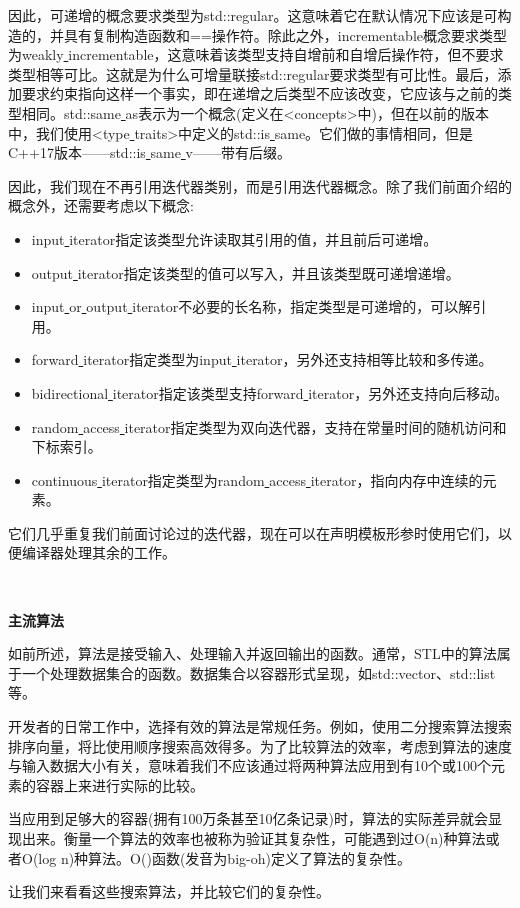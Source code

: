 因此，可递增的概念要求类型为std::regular。这意味着它在默认情况下应该是可构造的，并具有复制构造函数和==操作符。除此之外，incrementable概念要求类型为weakly\underline{ }incrementable，这意味着该类型支持自增前和自增后操作符，但不要求类型相等可比。这就是为什么可增量联接std::regular要求类型有可比性。最后，添加要求约束指向这样一个事实，即在递增之后类型不应该改变，它应该与之前的类型相同。std::same\underline{ }as表示为一个概念(定义在<concepts>中)，但在以前的版本中，我们使用<type\underline{ }traits>中定义的std::is\underline{ }same。它们做的事情相同，但是C++17版本——std::is\underline{ }same\underline{ }v——带有后缀。 \par
因此，我们现在不再引用迭代器类别，而是引用迭代器概念。除了我们前面介绍的概念外，还需要考虑以下概念: \par

\begin{itemize}
	\item input\underline{ }iterator指定该类型允许读取其引用的值，并且前后可递增。
	\item output\underline{ }iterator指定该类型的值可以写入，并且该类型既可递增递增。
	\item input\underline{ }or\underline{ }output\underline{ }iterator不必要的长名称，指定类型是可递增的，可以解引用。
	\item forward\underline{ }iterator指定类型为input\underline{ }iterator，另外还支持相等比较和多传递。
	\item bidirectional\underline{ }iterator指定该类型支持forward\underline{ }iterator，另外还支持向后移动。
	\item random\underline{ }access\underline{ }iterator指定类型为双向迭代器，支持在常量时间的随机访问和下标索引。
	\item continuous\underline{ }iterator指定类型为random\underline{ }access\underline{ }iterator，指向内存中连续的元素。
\end{itemize}

它们几乎重复我们前面讨论过的迭代器，现在可以在声明模板形参时使用它们，以便编译器处理其余的工作。 \par

\noindent\textbf{}\ \par
\textbf{主流算法} \ \par
如前所述，算法是接受输入、处理输入并返回输出的函数。通常，STL中的算法属于一个处理数据集合的函数。数据集合以容器形式呈现，如std::vector、std::list等。 \par
开发者的日常工作中，选择有效的算法是常规任务。例如，使用二分搜索算法搜索排序向量，将比使用顺序搜索高效得多。为了比较算法的效率，考虑到算法的速度与输入数据大小有关，意味着我们不应该通过将两种算法应用到有10个或100个元素的容器上来进行实际的比较。 \par
当应用到足够大的容器(拥有100万条甚至10亿条记录)时，算法的实际差异就会显现出来。衡量一个算法的效率也被称为验证其复杂性，可能遇到过O(n)种算法或者O(log n)种算法。O()函数(发音为big-oh)定义了算法的复杂性。 \par
让我们来看看这些搜索算法，并比较它们的复杂性。 \par

